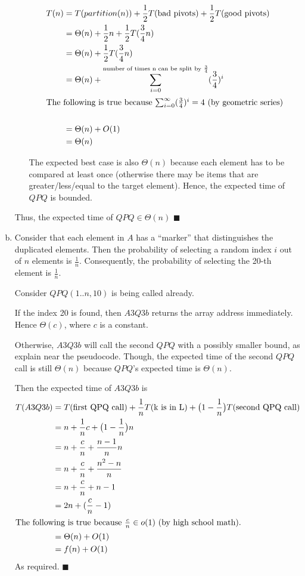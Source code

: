\documentclass[12pt]{article}
\begin{document}
\begin{enumerate}[(a)]
\begin{itemize}
\begin{align*}
T(n) &= T(partition(n)) + \frac{1}{2}T(\text{bad pivots}) + \frac{1}{2}T(\text{good pivots})\\
	&= \Theta(n) + \frac{1}{2}n + \frac{1}{2}T(\frac{3}{4}n)\\
	&= \Theta(n) + \frac{1}{2}T(\frac{3}{4}n)\\
	&= \Theta(n) + \sum_{i = 0}^{\text{number of times n can be split by $\frac{3}{4}$}} (\frac{3}{4})^i\\
	\intertext{The following is true because $\sum_{i = 0}^{\infty} (\frac{3}{4})^i = 4$ (by geometric series)}\\
	&= \Theta(n) + O(1)\\
	&= \Theta(n)
\end{align*}

The expected best case is also $\Theta(n)$ because each element has to be compared at least once (otherwise there may be items that are greater/less/equal to the target element).
Hence, the expected time of $QPQ$ is bounded.
\end{itemize}
Thus, the expected time of $QPQ \in \Theta(n)$
\hfill $\blacksquare$

\item
Consider that each element in $A$ has a ``marker'' that distinguishes the duplicated elements.
Then the probability of selecting a random index $i$ out of $n$ elements is $\frac{1}{n}$.
Consequently, the probability of selecting the 20-th element is $\frac{1}{n}$.

Consider $QPQ(1..n,10)$ is being called already.

If the index 20 is found, then $A3Q3b$ returns the array address immediately.
Hence $\Theta(c)$, where $c$ is a constant.

Otherwise, $A3Q3b$ will call the second $QPQ$ with a possibly smaller bound, as explain near the pseudocode.
Though, the expected time of the second $QPQ$ call is still $\Theta(n)$ because $QPQ$'s expected time is $\Theta(n)$.

Then the expected time of $A3Q3b$ is
\begin{align*}
T(A3Q3b) &= T(\text{first QPQ call}) + \frac{1}{n}T(\text{k is in L}) + \big (1-\frac{1}{n} \big ) T(\text{second QPQ call})\\
	&= n + \frac{1}{n} c + \big (1-\frac{1}{n} \big ) n\\
	&= n +  \frac{c}{n} + \frac{n-1}{n} n\\
	&= n + \frac{c}{n} + \frac{n^2 -n}{n}\\
	&= n + \frac{c}{n} + n - 1\\
	&= 2n + (\frac{c}{n}-1)\\
\intertext{The following is true because $\frac{c}{n} \in o(1)$ (by high school math).}
	&= \Theta(n) + O(1)\\
	&= f(n) + O(1)
\end{align*}
As required.
\hfill $\blacksquare$

\end{enumerate}
\end{document}
